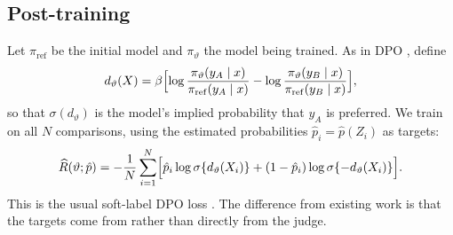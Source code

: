 \subsection{Post-training}
\label{sec:post-training}

Let $\pi_{\mathrm{ref}}$ be the initial model and $\pi_\vartheta$ the model being trained. As in DPO
\citep{rafailov2023dpo}, define
\[
  d_\vartheta(X)=\beta\Bigl[\log\frac{\pi_\vartheta(y_A\mid x)}{\pi_{\mathrm{ref}}(y_A\mid x)}
  -\log\frac{\pi_\vartheta(y_B\mid x)}{\pi_{\mathrm{ref}}(y_B\mid x)}\Bigr],
\]
so that $\sigma(d_\vartheta)$ is the model's implied probability that $y_A$ is preferred. We train on
all $N$ comparisons, using the estimated probabilities $\hat p_i=\hat p(Z_i)$ as targets:
\[
  \widehat R(\vartheta;\hat p)=-\frac1N\sum_{i=1}^{N}
  \Bigl[\hat p_i\log\sigma\{d_\vartheta(X_i)\}+(1-\hat p_i)\log\sigma\{-d_\vartheta(X_i)\}\Bigr].
\]
This is the usual soft-label DPO loss \citep{lee2024rlaif,furuta2024gapo}. The difference from
existing work is that the targets come from \dfsp{} rather than directly from the judge.
